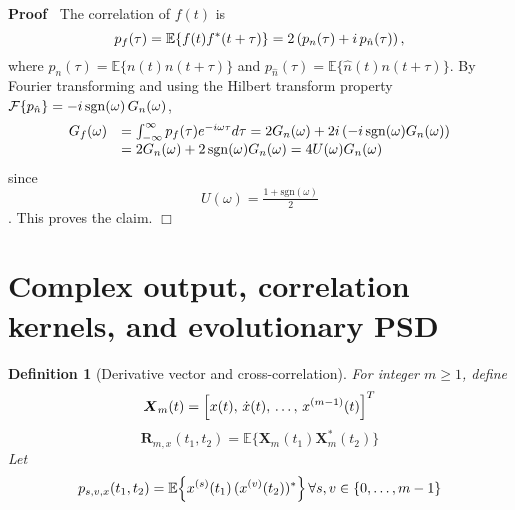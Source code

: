 \documentclass{article}
\newcommand{\tmmathbf}[1]{\ensuremath{\boldsymbol{#1}}}
\newenvironment{proof}{\noindent\textbf{Proof\ }}{\hspace*{\fill}$\Box$\medskip}
\newtheorem{definition}{Definition}
\begin{document}
\begin{proof}
  The correlation of $f (t)$ is
  \begin{equation}
    p_f (\tau) =\mathbb{E} \{f (t) f^{\ast} (t + \tau)\} = 2 \left( p_n (\tau)
    + i \hspace{0.17em} p_{\hat{n}} (\tau) \right),
  \end{equation}
  where $p_n (\tau) =\mathbb{E} \{n (t) n (t + \tau)\}$ and $p_{\hat{n}}
  (\tau) =\mathbb{E} \{ \hat{n} (t) n (t + \tau)\}$. By Fourier transforming
  and using the Hilbert transform property $\mathcal{F} \{p_{\hat{n}} \} = - i
  \hspace{0.17em} \mathrm{sgn} (\omega)  \hspace{0.17em} G_n (\omega)$,
  \begin{equation}
    \begin{array}{ll}
      G_f (\omega) & = \int_{- \infty}^{\infty} p_f (\tau) e^{- i \omega \tau}
      d \tau = 2 G_n (\omega) + 2 i \left( - i \hspace{0.17em} \mathrm{sgn}
      (\omega) G_n (\omega) \right)\\
      & = 2 G_n (\omega) + 2 \hspace{0.17em} \mathrm{sgn} (\omega) G_n
      (\omega) = 4 U (\omega) G_n (\omega)
    \end{array}
  \end{equation}
  since
  \begin{equation}
    U (\omega) = \tfrac{1 + \mathrm{sgn} (\omega)}{2}
  \end{equation}
  . This proves the claim.
\end{proof}

\section{Complex output, correlation kernels, and evolutionary PSD}

\begin{definition}
  [Derivative vector and cross-correlation] For integer $m \ge 1$, define
  \begin{equation}
    \tmmathbf{X}_m (t) = \left[ x (t), \hspace{0.17em} \dot{x} (t),
    \hspace{0.17em} \ldots, \hspace{0.17em} x^{(m - 1)} (t) \right]^T
  \end{equation}
  \begin{equation}
    \tmmathbf{R}_{m, x} (t_1, t_2) =\mathbb{E} \{\tmmathbf{X}_m
    (t_1)\tmmathbf{X}_m^{\ast} (t_2)\}
  \end{equation}
  Let
  \begin{equation}
    \label{eq:psv} p_{s, v, x} (t_1, t_2) =\mathbb{E} \hspace{-0.17em} \left\{
    x^{(s)} (t_1) \hspace{0.17em} (x^{(v)} (t_2))^{\ast} \right\} \forall s, v
    \in \{0, \ldots, m - 1\}
  \end{equation}
\end{definition}
\end{document}
